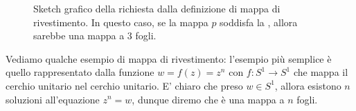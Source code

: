 \begin{figure}[htbp]
	\caption{Sketch grafico della \protect{} richiesta dalla definizione di mappa di rivestimento. In questo caso, se la mappa $p$ soddisfa la \protect{}, \protect{} allora sarebbe una mappa a $3$ fogli.}
\end{figure}

Vediamo qualche esempio di mappa di rivestimento: l'esempio più semplice è quello rappresentato dalla funzione $w = f(z) = z^n$ con $f: S^1 \to S^1$ che mappa il cerchio unitario
nel cerchio unitario. E' chiaro che preso $w \in S^1$, allora esistono $n$ soluzioni all'equazione $z^n = w$, dunque diremo che è una mappa a $n$ fogli.
